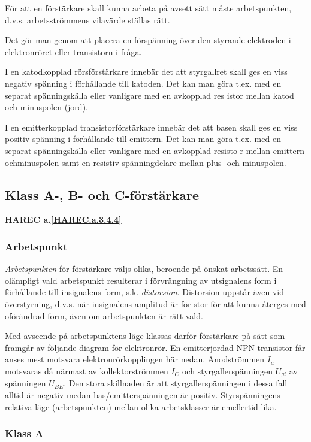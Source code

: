 För att en förstärkare skall kunna arbeta på avsett sätt måste
arbetspunkten, d.v.s.  arbetsströmmens vilavärde ställas rätt.

Det gör man genom att placera en förspänning över den styrande
elektroden i elektronröret eller transistorn i fråga.

I en katodkopplad rörsförstärkare innebär det att styrgallret skall
ges en viss negativ spänning i förhållande till katoden. Det kan man
göra t.ex. med en separat spänningskälla eller vanligare med en
avkopplad res istor mellan katod och minuspolen (jord).

I en emitterkopplad transistorförstärkare innebär det att basen skall
ges en viss positiv spänning i förhållande till emittern. Det kan man
göra t.ex. med en separat spänningskälla eller vanligare med en
avkopplad resisto r mellan emittern ochminuspolen samt en resistiv
spänningdelare mellan plus- och minuspolen.

\subsection{Klass A-, B- och C-förstärkare}
\textbf{HAREC a.\ref{HAREC.a.3.4.4}\label{myHAREC.a.3.4.4}}

\subsubsection{Arbetspunkt}

\emph{Arbetspunkten} för förstärkare väljs olika, beroende på önskat
arbetssätt. En olämpligt vald arbetspunkt resulterar i förvrängning av
utsignalens form i förhållande till insignalens form,
s.k. \emph{distorsion}. Distorsion uppstår även vid överstyrning,
d.v.s. när insignalens amplitud är för stor för att kunna återges med
oförändrad form, även om arbetspunkten är rätt vald.

Med avseende på arbetspunktens läge klassas därför förstärkare på sätt
som framgår av följande diagram för elektronrör. En emitterjordad
NPN-transistor får anses mest motsvara elektronrörkopplingen här
nedan.  Anodströmmen \(I_a\) motsvaras då närmast av kollektorströmmen
\(I_C\) och styrgallerspänningen \(U_{gi}\) av spänningen
\(U_{BE}\). Den stora skillnaden är att styrgallerspänningen i dessa
fall alltid är negativ medan bas/emitterspänningen är
positiv. Styrspänningens relativa läge (arbetspunkten) mellan olika
arbetsklasser är emellertid lika.

\subsubsection{Klass A}


